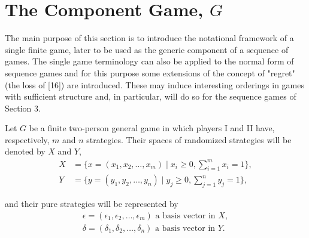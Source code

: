 \documentclass[11pt]{article}
\theoremstyle{boldStyle}
\begin{document}
\section{The Component Game, $G$}

The main purpose of this section is to introduce the notational framework of a single finite game, later to be used as the generic component of a sequence of games. The single game terminology can also be applied to the normal form of sequence games and for this purpose some extensions of the concept of "regret" (the loss of [16]) are introduced. These may induce interesting orderings in games with sufficient structure and, in particular, will do so for the sequence games of Section 3.

\medbreak

Let $G$ be a finite two-person general game in which players I and II have, respectively, $m$ and $n$ strategies. Their spaces of randomized strategies will be denoted by $X$ and $Y$,
\begin{equation} \label{eq:1}
        \begin{aligned}
            X &= \{x = (x_1, x_2, \ldots, x_m) \mid x_i \geq 0, \sum_{i=1}^m x_i = 1\}, \\
            Y &= \{y = (y_1, y_2, \ldots, y_n) \mid y_j \geq 0, \sum_{j=1}^n y_j = 1\},
        \end{aligned}
\end{equation}

and their pure strategies will be represented by
\begin{equation} \label{eq:2}
    \begin{aligned}
        \epsilon = (\epsilon_1, \epsilon_2, \ldots, \epsilon_m) \text{ a basis vector in } X, \\
        \delta = (\delta_1, \delta_2, \ldots, \delta_n) \text{ a basis vector in } Y.
\   \end{aligned}   
\end{equation}
\end{document}
